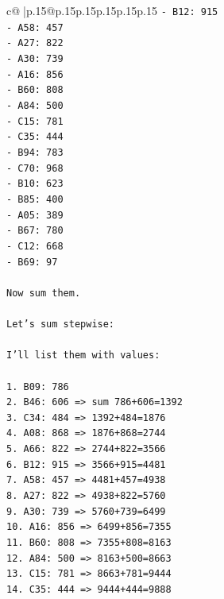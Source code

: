 \documentclass{article}
\begin{document}
{\begin{supertabular}{c@{$\;$}|p{.15\linewidth}@{}p{.15\linewidth}p{.15\linewidth}p{.15\linewidth}p{.15\linewidth}p{.15\linewidth}}
{{{\texttt{{-} B12: 915} \\
\texttt{{-} A58: 457} \\
\texttt{{-} A27: 822} \\
\texttt{{-} A30: 739} \\
\texttt{{-} A16: 856} \\
\texttt{{-} B60: 808} \\
\texttt{{-} A84: 500} \\
\texttt{{-} C15: 781} \\
\texttt{{-} C35: 444} \\
\texttt{{-} B94: 783} \\
\texttt{{-} C70: 968} \\
\texttt{{-} B10: 623} \\
\texttt{{-} B85: 400} \\
\texttt{{-} A05: 389} \\
\texttt{{-} B67: 780} \\
\texttt{{-} C12: 668} \\
\texttt{{-} B69: 97} \\
\\ 
\texttt{Now sum them.} \\
\\ 
\texttt{Let's sum stepwise:} \\
\\ 
\texttt{I'll list them with values:} \\
\\ 
\texttt{1. B09: 786} \\
\texttt{2. B46: 606 => sum 786+606=1392} \\
\texttt{3. C34: 484 => 1392+484=1876} \\
\texttt{4. A08: 868 => 1876+868=2744} \\
\texttt{5. A66: 822 => 2744+822=3566} \\
\texttt{6. B12: 915 => 3566+915=4481} \\
\texttt{7. A58: 457 => 4481+457=4938} \\
\texttt{8. A27: 822 => 4938+822=5760} \\
\texttt{9. A30: 739 => 5760+739=6499} \\
\texttt{10. A16: 856 => 6499+856=7355} \\
\texttt{11. B60: 808 => 7355+808=8163} \\
\texttt{12. A84: 500 => 8163+500=8663} \\
\texttt{13. C15: 781 => 8663+781=9444} \\
\texttt{14. C35: 444 => 9444+444=9888} \\
}}}
\end{supertabular}}
\end{document}
